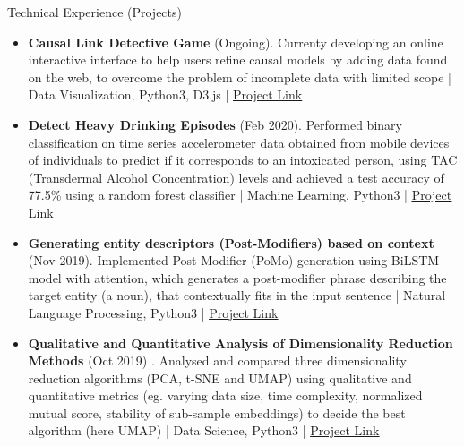 \documentclass[]{mcdowellcv}
\begin{document}
	\begin{cvsection}{Technical Experience (Projects)}
		\begin{cvsubsection}{}{}{}
			\begin{itemize}
				\item \textbf{Causal Link Detective Game} (Ongoing). Currenty developing an online interactive interface to help users refine causal models by adding data found on the web, to overcome the problem of incomplete data with limited scope | Data Visualization, Python3, D3.js |  \underline{\href{https://github.com/Trisha11r/Causal_Link_Detective}{Project Link}}
			\end{itemize}
		\end{cvsubsection}
				
			\begin{cvsubsection}{}{}{}
			\begin{itemize}
				\item \textbf{Detect Heavy Drinking Episodes} (Feb 2020). Performed binary classification on time series accelerometer data obtained from mobile devices of individuals to predict if it corresponds to an intoxicated person, using TAC (Transdermal Alcohol Concentration) levels and achieved a test accuracy of 77.5\% using a random forest classifier | Machine Learning, Python3 |  \underline{\href{https://github.com/Trisha11r/Detect_Heavy_Drinking_Episodes}{Project Link}}
			\end{itemize}
		\end{cvsubsection}
				
		\begin{cvsubsection}{}{}{}
			\begin{itemize}
				\item \textbf{Generating entity descriptors (Post-Modifiers) based on context} (Nov 2019).  Implemented Post-Modifier (PoMo) generation using BiLSTM model with attention, which generates a post-modifier phrase describing the target entity (a noun), that contextually fits in the input sentence | 
				Natural Language Processing, Python3 | \underline{\href{https://github.com/Trisha11r/Improvement-on-Knowledge-backed-Generation-Model-Using-Post-Modifier-Dataset}{Project Link}}
			\end{itemize}
		\end{cvsubsection}
				
		\begin{cvsubsection}{}{}{}
			\begin{itemize}
				\item \textbf{Qualitative and Quantitative Analysis of Dimensionality Reduction Methods}  (Oct 2019) .  Analysed and compared three dimensionality reduction algorithms (PCA, t-SNE and UMAP) using qualitative and quantitative metrics (eg. varying data size, time complexity, normalized mutual score, stability of sub-sample embeddings) to decide the best algorithm (here UMAP) | Data Science, Python3 |  \underline{\href{https://github.com/Trisha11r/dim_reduction_study}{Project Link}}
			\end{itemize}
		\end{cvsubsection}
				

\end{cvsection}
\end{document}
